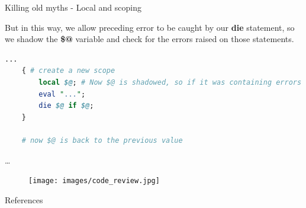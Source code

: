 \documentclass[10pt]{beamer}
\begin{document}
\begin{frame}[fragile]{Killing old myths - Local and scoping}

But in this way, we allow preceding error to be caught by our \textbf{die} statement, so we shadow the \textbf{\$@} variable and check for the errors raised on those statements.

    \begin{lstlisting}[language=perl]
    ...
    { # create a new scope
        local $@; # Now $@ is shadowed, so if it was containing errors of previous calls, now it's back to default
        eval "...";
        die $@ if $@;
    }

    # now $@ is back to the previous value

    \end{lstlisting}

\end{frame}


\begin{frame}[fragile]{\ldots}

\begin{figure}
    \centering
    \texttt{[image: images/code\_review.jpg]}
\end{figure}

\end{frame}


\begin{frame}[allowframebreaks]{References}

  
  
\end{frame}



\end{document}
